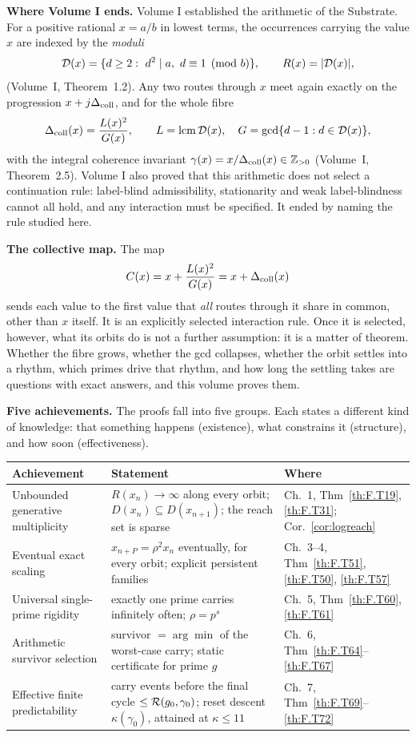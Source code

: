 \textbf{Where Volume I ends.} Volume I established the arithmetic of the Substrate. For a positive rational \(x=a/b\) in lowest terms, the occurrences carrying the value \(x\) are indexed by the \emph{moduli}
\[
\mathcal{D}(x)=\{d\ge2:\ d^2\mid a,\ d\equiv1\pmod b\},\qquad R(x)=|\mathcal{D}(x)|,
\]
(Volume~I, Theorem~1.2). Any two routes through \(x\) meet again exactly on the progression \(x+j\Delta_{\mathrm{coll}}\), and for the whole fibre
\[
\Delta_{\mathrm{coll}}(x)=\frac{L(x)^2}{G(x)},\qquad L=\operatorname{lcm}\mathcal{D}(x),\quad G=\gcd\{d-1:d\in\mathcal{D}(x)\},
\]
with the integral coherence invariant \(\gamma(x)=x/\Delta_{\mathrm{coll}}(x)\in\mathbb{Z}_{>0}\) (Volume~I, Theorem~2.5). Volume I also proved that this arithmetic does not select a continuation rule: label-blind admissibility, stationarity and weak label-blindness cannot all hold, and any interaction must be specified. It ended by naming the rule studied here.

\textbf{The collective map.} The map
\[
C(x)=x+\frac{L(x)^2}{G(x)}=x+\Delta_{\mathrm{coll}}(x)
\]
sends each value to the first value that \emph{all} routes through it share in common, other than \(x\) itself. It is an explicitly selected interaction rule. Once it is selected, however, what its orbits do is not a further assumption: it is a matter of theorem. Whether the fibre grows, whether the gcd collapses, whether the orbit settles into a rhythm, which primes drive that rhythm, and how long the settling takes are questions with exact answers, and this volume proves them.

\textbf{Five achievements.} The proofs fall into five groups. Each states a different kind of knowledge: that something happens (existence), what constrains it (structure), and how soon (effectiveness).

\begin{center}\small
\renewcommand{\arraystretch}{1.1}
\begin{tabular}{|p{3.9cm}|p{6.7cm}|p{3.3cm}|}
\hline \textbf{Achievement} & \textbf{Statement} & \textbf{Where}\\\hline
Unbounded generative multiplicity & \(R(x_n)\to\infty\) along every orbit; \(D(x_n)\subseteq D(x_{n+1})\); the reach set is sparse & Ch.~1, Thm~\ref{th:F.T19}, \ref{th:F.T31}; Cor.~\ref{cor:logreach}\\\hline
Eventual exact scaling & \(x_{n+P}=\rho^2x_n\) eventually, for every orbit; explicit persistent families & Ch.~3--4, Thm~\ref{th:F.T51}, \ref{th:F.T50}, \ref{th:F.T57}\\\hline
Universal single-prime rigidity & exactly one prime carries infinitely often; \(\rho=p^s\) & Ch.~5, Thm~\ref{th:F.T60}, \ref{th:F.T61}\\\hline
Arithmetic survivor selection & survivor \(=\arg\min\) of the worst-case carry; static certificate for prime \(g\) & Ch.~6, Thm~\ref{th:F.T64}--\ref{th:F.T67}\\\hline
Effective finite predictability & carry events before the final cycle \(\le\mathcal{R}(g_0,\gamma_0)\); reset descent \(\kappa(\gamma_0)\), attained at \(\kappa\le11\) & Ch.~7, Thm~\ref{th:F.T69}--\ref{th:F.T72}\\\hline
\end{tabular}
\end{center}

